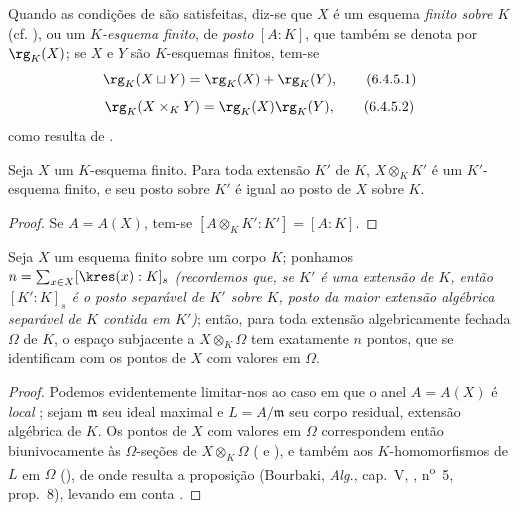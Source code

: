 \documentclass[oneside]{amsart}
\newcommand{\oldpage}[2][]{{\marginnote{\normalfont\textbf{#1}~|~#2}}\ignorespaces}
\let\EGAOriginalLabel\label
\renewcommand{\label}[1]{\phantomsection\EGAOriginalLabel{#1}}
\begin{document}
\begin{env}[6.4.5]
\label{I.6.4.5}
Quando as condições de  são satisfeitas, diz-se que $X$ é um esquema \emph{finito sobre $K$} (cf. ), ou um \emph{$K$-esquema finito}, de \emph{posto} $[A:K]$, que também se denota por $\rg_K(X)$;
se $X$ e $Y$ são $K$-esquemas finitos, tem-se
\[
  \rg_K(X\sqcup Y)=\rg_K(X)+\rg_K(Y),
  \tag{6.4.5.1}
\]
\[
  \rg_K(X\times_K Y)=\rg_K(X)\rg_K(Y),
  \tag{6.4.5.2}
\]
como resulta de .
\end{env}

\begin{corollary}[6.4.6]
\label{I.6.4.6}
Seja $X$ um $K$-esquema finito.
Para toda extensão $K'$ de $K$, $X\otimes_K K'$ é um $K'$-esquema finito, e seu posto sobre $K'$ é igual ao posto de $X$ sobre $K$.
\end{corollary}

\begin{proof}
Se $A=A(X)$, tem-se $[A\otimes_K K':K']=[A:K]$.
\end{proof}

\begin{corollary}[6.4.7]
\label{I.6.4.7}
Seja $X$ um esquema finito sobre um corpo $K$;
ponhamos $n=\sum_{x\in X}[\kres(x):K]_s$ \emph{(recordemos que, se $K'$ é uma extensão de $K$, então $[K':K]_s$ é o \emph{posto separável} de $K'$ sobre $K$, posto da maior extensão algébrica separável de $K$ contida em $K'$)};
\oldpage[I]{149}
então,
para toda extensão algebricamente fechada $\Omega$ de $K$, o espaço subjacente a $X\otimes_K\Omega$ tem exatamente $n$ pontos, que se identificam com os pontos de $X$ com valores em $\Omega$.
\end{corollary}

\begin{proof}
Podemos evidentemente limitar-nos ao caso em que o anel $A=A(X)$ é \emph{local} ;
sejam $\mathfrak{m}$ seu ideal maximal e $L=A/\mathfrak{m}$ seu corpo residual, extensão algébrica de $K$.
Os pontos de $X$ com valores em $\Omega$ correspondem então biunivocamente às $\Omega$-seções de $X\otimes_K\Omega$ ( e ), e também aos $K$-homomorfismos de $L$ em $\Omega$ (), de onde resulta a proposição (Bourbaki, \emph{Alg.}, cap.~V, , n\textsuperscript{o}~5, prop.~8), levando em conta .
\end{proof}
\end{document}

